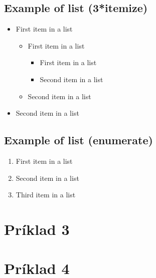 \documentclass[paper=a4, fontsize=11pt]{scrartcl} %
\numberwithin{equation}{section} %
\numberwithin{figure}{section} %
\numberwithin{table}{section} %
\begin{document}
\subsection{Example of list (3*itemize)}
\begin{itemize}
	\item First item in a list 
		\begin{itemize}
		\item First item in a list 
			\begin{itemize}
			\item First item in a list 
			\item Second item in a list 
			\end{itemize}
		\item Second item in a list 
		\end{itemize}
	\item Second item in a list 
\end{itemize}


\subsection{Example of list (enumerate)}
\begin{enumerate}
\item First item in a list 
\item Second item in a list 
\item Third item in a list
\end{enumerate}


\pagebreak

\section*{Príklad 3}

\pagebreak

\section*{Príklad 4}
\end{document}
